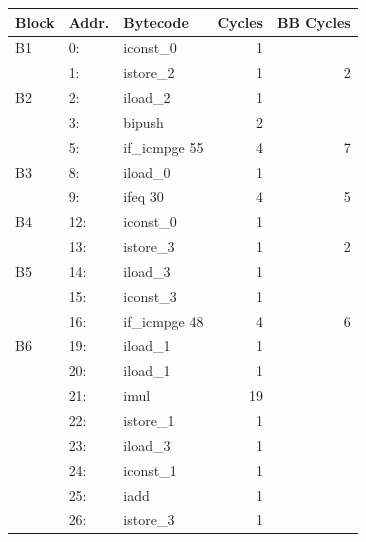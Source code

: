\begin{table}
\begin{center}
\begin{tiny}
\begin{tabular}{lllrr}
    \toprule
    Block & Addr. & Bytecode & Cycles & BB Cycles\\
    \midrule
B1  & 0: &     iconst\_0         &           1        &           \\
    & 1: &     istore\_2         &           1        &                2 \\
    \cmidrule{1-5}
B2  & 2: &     iload\_2          &           1        &           \\
    & 3: &     bipush            &          2         &          \\
    & 5: &     if\_icmpge 55     &           4        &                7 \\
    \cmidrule{1-5}
B3  & 8: &     iload\_0          &           1        &           \\
    & 9: &     ifeq 30           &          4         &               5 \\
    \cmidrule{1-5}
B4  & 12: &    iconst\_0         &           1        &           \\
    & 13: &    istore\_3         &           1        &                2 \\
    \cmidrule{1-5}
B5  & 14: &    iload\_3          &           1        &           \\
    & 15: &    iconst\_3         &           1        &           \\
    & 16: &    if\_icmpge 48     &           4        &                6 \\
    \cmidrule{1-5}
B6  & 19: &    iload\_1          &           1        &           \\
    & 20: &    iload\_1          &           1        &           \\
    & 21: &    imul              &         19         &          \\
    & 22: &    istore\_1         &           1        &           \\
    & 23: &    iload\_3          &           1        &           \\
    & 24: &    iconst\_1         &           1        &           \\
    & 25: &    iadd              &          1         &          \\
    & 26: &    istore\_3         &           1        &           \\

\end{tabular}
\end{tiny}
\end{center}
\end{table}
